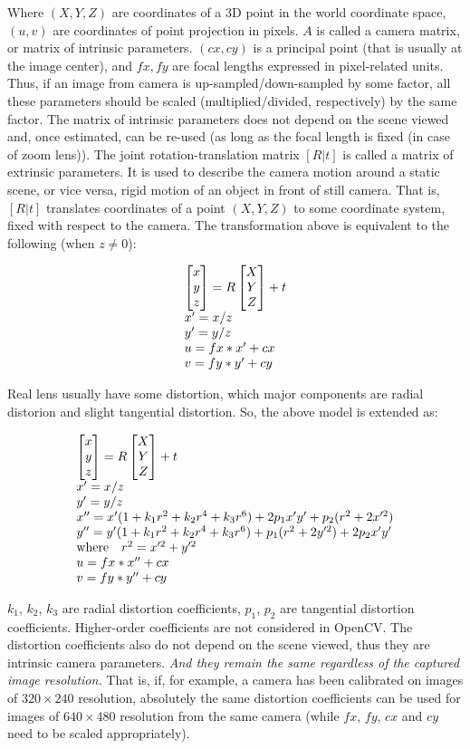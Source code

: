 Where $(X, Y, Z)$ are coordinates of a 3D point in the world
coordinate space, $(u, v)$ are coordinates of point projection
in pixels. $A$ is called a camera matrix, or matrix of
intrinsic parameters. $(cx, cy)$ is a principal point (that is
usually at the image center), and $fx, fy$ are focal lengths
expressed in pixel-related units. Thus, if an image from camera is
up-sampled/down-sampled by some factor, all these parameters should
be scaled (multiplied/divided, respectively) by the same factor. The
matrix of intrinsic parameters does not depend on the scene viewed and,
once estimated, can be re-used (as long as the focal length is fixed (in
case of zoom lens)). The joint rotation-translation matrix $[R|t]$
is called a matrix of extrinsic parameters. It is used to describe the
camera motion around a static scene, or vice versa, rigid motion of an
object in front of still camera. That is, $[R|t]$ translates
coordinates of a point $(X, Y, Z)$ to some coordinate system,
fixed with respect to the camera. The transformation above is equivalent
to the following (when $z \ne 0$):

\[
\begin{array}{l}
\begin{bmatrix} x\\ y\\ z \end{bmatrix} = R \begin{bmatrix} X\\ Y\\ Z \end{bmatrix} + t\\
x' = x/z\\
y' = y/z\\
u = fx*x' + cx\\
v = fy*y' + cy
\end{array}
\]

Real lens usually have some distortion, which major components are
radial distorion and slight tangential distortion. So, the above model
is extended as:

\[
\begin{array}{l}
\begin{bmatrix} x\\ y\\ z \end{bmatrix} = R \begin{bmatrix} X\\ Y\\ Z \end{bmatrix} + t\\
x' = x/z\\
y' = y/z\\
x'' = x' (1 + k_1 r^2 + k_2 r^4 + k_3 r^6) + 2 p_1 x' y' + p_2(r^2 + 2 x'^2) \\
y'' = y' (1 + k_1 r^2 + k_2 r^4 + k_3 r^6) + p_1 (r^2 + 2 y'^2) + 2 p_2 x' y' \\
\text{where} \quad r^2 = x'^2 + y'^2 \\
u = fx*x'' + cx\\
v = fy*y'' + cy
\end{array}
\]

$k_1$, $k_2$, $k_3$ are radial distortion coefficients, $p_1$, $p_2$ are tangential distortion coefficients.
Higher-order coefficients are not considered in OpenCV.
The distortion coefficients also do not depend on the scene viewed, thus they are intrinsic camera parameters.
\emph{And they remain the same regardless of the captured image resolution.}
That is, if, for example, a camera has been calibrated on images of $320
\times 240$ resolution, absolutely the same distortion coefficients can
be used for images of $640 \times 480$ resolution from the same camera (while $fx$,
$fy$, $cx$ and $cy$ need to be scaled appropriately).

